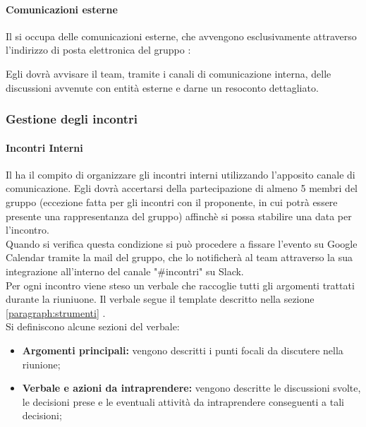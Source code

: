 \paragraph{Comunicazioni esterne}
Il \roleProjectManager{} si occupa delle comunicazioni esterne, che avvengono esclusivamente attraverso l'indirizzo di posta elettronica del gruppo \groupName:
\begin{center} 
	\groupEmail
\end{center}
Egli dovrà avvisare il team, tramite i canali di comunicazione interna, delle discussioni avvenute con entità esterne e darne un resoconto dettagliato. 
\subsubsection{Gestione degli incontri}\label{section:incontri}
\paragraph{Incontri Interni}
Il \roleProjectManager{} ha il compito di organizzare gli incontri interni utilizzando l'apposito canale di comunicazione. Egli dovrà accertarsi della partecipazione di almeno 5 membri del gruppo (eccezione fatta per gli incontri con il proponente, in cui potrà essere presente una rappresentanza del gruppo) affinchè si possa stabilire una data per l'incontro. \\Quando si verifica questa condizione si può procedere a fissare l'evento su Google Calendar tramite la mail del gruppo, che lo notificherà al team attraverso la sua integrazione all'interno del canale "\#incontri" su Slack. \\Per ogni incontro viene steso un verbale che raccoglie tutti gli argomenti trattati durante la riuniuone. Il verbale segue il template descritto nella sezione \ref{paragraph:strumenti} . \\Si definiscono alcune sezioni del verbale:
\begin{itemize}
	\item \textbf{Argomenti principali:} vengono descritti i punti focali da discutere nella riunione;
	\item \textbf{Verbale e azioni da intraprendere:} vengono descritte le discussioni svolte, le decisioni prese e le eventuali attività da intraprendere conseguenti a tali decisioni;
\end{itemize}

